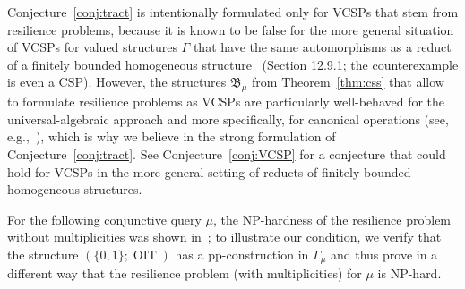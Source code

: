 \documentclass[nonacm]{acmart}
\newcommand{\bB}{{\mathfrak B}}
\DeclareMathOperator{\OIT}{OIT}
\begin{document}
Conjecture~\ref{conj:tract} is intentionally formulated only  for VCSPs that stem from resilience problems, because it is known to be false for the more general situation of VCSPs for valued structures $\Gamma$ that have the same automorphisms as a reduct of a finitely bounded homogeneous structure~\cite{Book} (Section 12.9.1; the counterexample is even a CSP). However, the structures $\bB_\mu$ from Theorem~\ref{thm:css} that allow to formulate
resilience problems as VCSPs are particularly well-behaved for the universal-algebraic approach and more specifically, for canonical operations (see, e.g.,~\cite{MMSNP,BodirskyBodorUIPJournal,MottetPinskerSmooth}), which is why we believe in the strong formulation of Conjecture~\ref{conj:tract}. 
See Conjecture~\ref{conj:VCSP} for a conjecture that could hold for VCSPs in the more general setting of reducts of finitely bounded homogeneous structures.

For the following conjunctive query $\mu$, the NP-hardness of the resilience problem without multiplicities was shown in~\cite{Resilience}; to illustrate our condition, we verify that the structure $(\{0,1\}; \OIT)$ has a pp-construction in $\Gamma_\mu$
and thus prove in a different way that the resilience problem (with multiplicities) for $\mu$ is NP-hard. 
\end{document}
